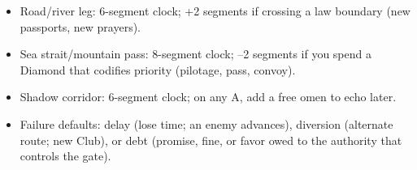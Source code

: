 \begin{itemize}
\item Road/river leg: 6-segment clock; +2 segments if crossing a law boundary (new passports, new prayers).
\item Sea strait/mountain pass: 8-segment clock; --2 segments if you spend a Diamond that codifies priority (pilotage, pass, convoy).
\item Shadow corridor: 6-segment clock; on any A, add a free omen to echo later.
\item Failure defaults: delay (lose time; an enemy advances), diversion (alternate route; new Club), or debt (promise, fine, or favor owed to the authority that controls the gate).
\end{itemize}

